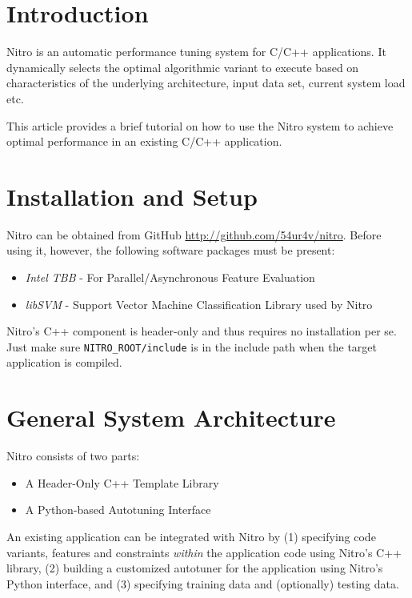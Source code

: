 \documentclass[12pt]{article}
\begin{document}
\maketitle

\section{Introduction}
Nitro is an automatic performance tuning system for C/C++ applications.
It dynamically selects the optimal algorithmic variant to execute based
on characteristics of the underlying architecture, input data set, current system load etc.

This article provides a brief tutorial on how to use the Nitro system to
achieve optimal performance in an existing C/C++ application.

\section{Installation and Setup}
Nitro can be obtained from GitHub \url{http://github.com/54ur4v/nitro}. Before
using it, however, the following software packages must be present:

\begin{itemize}
  \item \textsl{Intel TBB} - For Parallel/Asynchronous Feature Evaluation
  \item \textsl{libSVM} - Support Vector Machine Classification Library used by Nitro
\end{itemize}

Nitro's C++ component is header-only and thus requires no installation per se. Just
make sure \texttt{NITRO\_ROOT/include} is in the include path when the 
target application is compiled.

\section{General System Architecture}
Nitro consists of two parts:

\begin{itemize}
  \item A Header-Only C++ Template Library
  \item A Python-based Autotuning Interface
\end{itemize}

An existing application can be integrated with Nitro by (1) specifying code variants,
features and constraints \textsl{within} the application code using Nitro's
C++ library, (2) building a customized autotuner for the application using
Nitro's Python interface, and (3) specifying training data and (optionally)
testing data.
\end{document}
